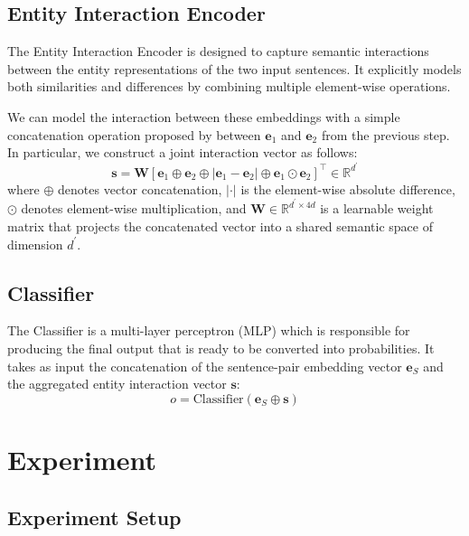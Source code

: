 \documentclass{llncs}
\begin{document}
\subsection{Entity Interaction Encoder}
The Entity Interaction Encoder is designed to capture semantic interactions between the entity representations of the two input sentences. It explicitly models both similarities and differences by combining multiple element-wise operations.

We can model the interaction between these embeddings with a simple concatenation operation proposed by \textcite{chen2017} between $\mathbf{e}_1$ and $\mathbf{e}_2$ from the previous step. In particular, we construct a joint interaction vector as follows:
\begin{equation}
    \mathbf{s} = \mathbf{W} \left[ 
    \mathbf{e}_1 \oplus
    \mathbf{e}_2 \oplus 
    \left| \mathbf{e}_1 - \mathbf{e}_2 \right| \oplus 
    \mathbf{e}_1 \odot \mathbf{e}_2 
\right]^\top \in \mathbb{R}^{d^\prime}
\end{equation}
where $\oplus$ denotes vector concatenation, $|\cdot|$ is the element-wise absolute difference, $\odot$ denotes element-wise multiplication, and $\mathbf{W} \in \mathbb{R}^{d^\prime \times 4d}$ is a learnable weight matrix that projects the concatenated vector into a shared semantic space of dimension $d^\prime$.

\subsection{Classifier}
The Classifier is a multi-layer perceptron (MLP) which is responsible for producing the final output that is ready to be converted into probabilities. It takes as input the concatenation of the sentence-pair embedding vector $\mathbf{e}_S$ and the aggregated entity interaction vector $\mathbf{s}$:
\begin{equation}
o = \mathrm{Classifier}({\mathbf{e}_S \oplus \mathbf{s}})
\end{equation}


\section{Experiment}
\label{sec:experiment}

\subsection{Experiment Setup}
\end{document}
